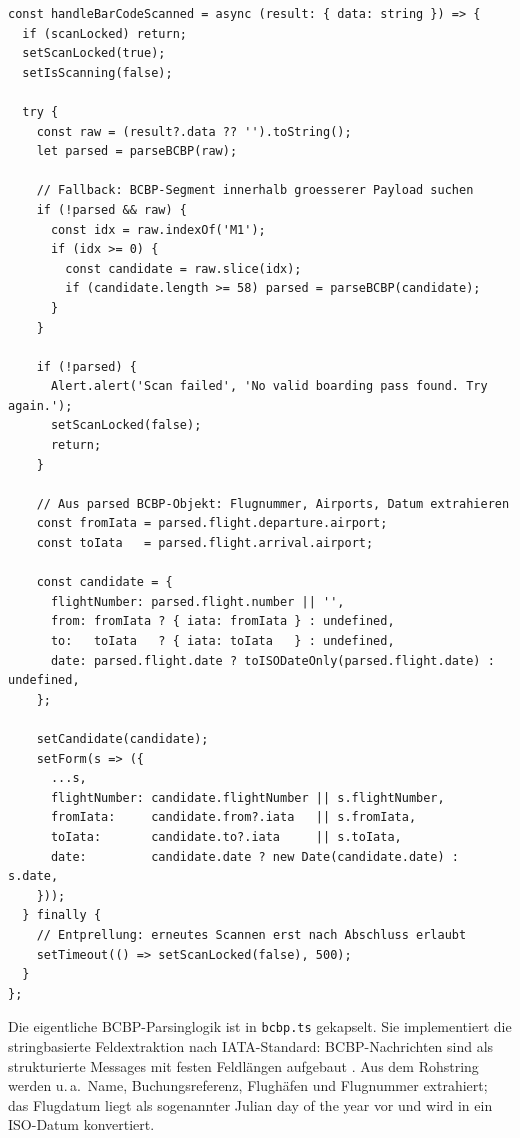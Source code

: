\begin{lstlisting}[caption={Verarbeitung des QR-/Barcode-Scans in Skyline (vereinfacht, Import-Screen)},label={lst:handle_barcode_scanned}]
const handleBarCodeScanned = async (result: { data: string }) => {
  if (scanLocked) return;
  setScanLocked(true);
  setIsScanning(false);

  try {
    const raw = (result?.data ?? '').toString();
    let parsed = parseBCBP(raw);

    // Fallback: BCBP-Segment innerhalb groesserer Payload suchen
    if (!parsed && raw) {
      const idx = raw.indexOf('M1');
      if (idx >= 0) {
        const candidate = raw.slice(idx);
        if (candidate.length >= 58) parsed = parseBCBP(candidate);
      }
    }

    if (!parsed) {
      Alert.alert('Scan failed', 'No valid boarding pass found. Try again.');
      setScanLocked(false);
      return;
    }

    // Aus parsed BCBP-Objekt: Flugnummer, Airports, Datum extrahieren
    const fromIata = parsed.flight.departure.airport;
    const toIata   = parsed.flight.arrival.airport;

    const candidate = {
      flightNumber: parsed.flight.number || '',
      from: fromIata ? { iata: fromIata } : undefined,
      to:   toIata   ? { iata: toIata   } : undefined,
      date: parsed.flight.date ? toISODateOnly(parsed.flight.date) : undefined,
    };

    setCandidate(candidate);
    setForm(s => ({
      ...s,
      flightNumber: candidate.flightNumber || s.flightNumber,
      fromIata:     candidate.from?.iata   || s.fromIata,
      toIata:       candidate.to?.iata     || s.toIata,
      date:         candidate.date ? new Date(candidate.date) : s.date,
    }));
  } finally {
    // Entprellung: erneutes Scannen erst nach Abschluss erlaubt
    setTimeout(() => setScanLocked(false), 500);
  }
};
\end{lstlisting}

Die eigentliche BCBP-Parsinglogik ist in \texttt{bcbp.ts} gekapselt.
Sie implementiert die stringbasierte Feldextraktion nach IATA-Standard:
BCBP-Nachrichten sind als strukturierte Messages mit festen Feldlängen aufgebaut \cite{iataBCBP}.
Aus dem Rohstring werden u.\,a.\ Name, Buchungsreferenz, Flughäfen und Flugnummer extrahiert;
das Flugdatum liegt als sogenannter \glqq Julian day of the year\grqq{} \cite{wikipediaJulianDay} vor und wird in ein
ISO-Datum konvertiert.

